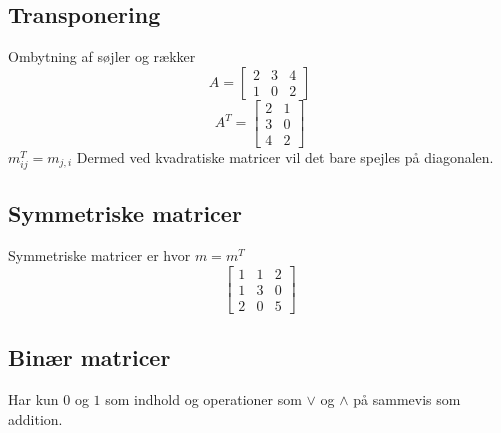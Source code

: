 \documentclass[12pt, a4paper]{article}
\begin{document}
		\subsection{Transponering}
			Ombytning af søjler og rækker
			$$A=\begin{bmatrix}2&3&4\\1&0&2\end{bmatrix}$$
			$$A^T=\begin{bmatrix}2&1\\3&0\\4&2\end{bmatrix}$$
			$m^T_{ij}=m_{j,i}$
			Dermed ved kvadratiske matricer vil det bare spejles på diagonalen.
		\subsection{Symmetriske matricer}
			Symmetriske matricer er hvor $m=m^T$
			$$\begin{bmatrix}1&1&2\\1&3&0\\2&0&5\end{bmatrix}$$
		\subsection{Binær matricer}
			Har kun $0$ og $1$ som indhold og operationer som $\lor$ og $\land$ på sammevis som addition.
\end{document}
